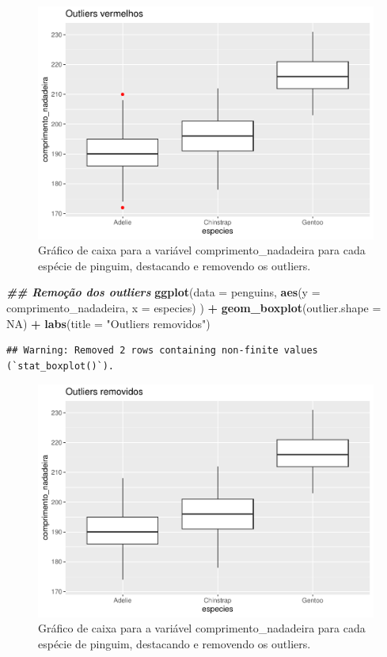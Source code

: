 \documentclass[
]{article}
\newenvironment{Shaded}{\begin{snugshade}}{\end{snugshade}}
\newcommand{\AttributeTok}[1]{\textcolor[rgb]{0.13,0.29,0.53}{#1}}
\newcommand{\ConstantTok}[1]{\textcolor[rgb]{0.56,0.35,0.01}{#1}}
\newcommand{\DocumentationTok}[1]{\textcolor[rgb]{0.56,0.35,0.01}{\textbf{\textit{#1}}}}
\newcommand{\FunctionTok}[1]{\textcolor[rgb]{0.13,0.29,0.53}{\textbf{#1}}}
\newcommand{\NormalTok}[1]{#1}
\newcommand{\SpecialCharTok}[1]{\textcolor[rgb]{0.81,0.36,0.00}{\textbf{#1}}}
\newcommand{\StringTok}[1]{\textcolor[rgb]{0.31,0.60,0.02}{#1}}
\begin{document}
\begin{figure}
\includegraphics[width=0.75\linewidth,height=0.75\textheight]{epr_files/figure-latex/fig-boxplot-outlier-1} \caption{Gráfico de caixa para a variável comprimento_nadadeira para cada espécie de pinguim, destacando e removendo os outliers.}\label{fig:fig-boxplot-outlier-1}
\end{figure}

\begin{Shaded}
\begin{Highlighting}[]
\DocumentationTok{\#\# Remoção dos outliers}
\FunctionTok{ggplot}\NormalTok{(}\AttributeTok{data =}\NormalTok{ penguins, }
       \FunctionTok{aes}\NormalTok{(}\AttributeTok{y =}\NormalTok{ comprimento\_nadadeira, }\AttributeTok{x =}\NormalTok{ especies)}
\NormalTok{       ) }\SpecialCharTok{+}
    \FunctionTok{geom\_boxplot}\NormalTok{(}\AttributeTok{outlier.shape =} \ConstantTok{NA}\NormalTok{) }\SpecialCharTok{+}
    \FunctionTok{labs}\NormalTok{(}\AttributeTok{title =} \StringTok{"Outliers removidos"}\NormalTok{)}
\end{Highlighting}
\end{Shaded}

\begin{verbatim}
## Warning: Removed 2 rows containing non-finite values (`stat_boxplot()`).
\end{verbatim}

\begin{figure}
\includegraphics[width=0.75\linewidth,height=0.75\textheight]{epr_files/figure-latex/fig-boxplot-outlier-2} \caption{Gráfico de caixa para a variável comprimento_nadadeira para cada espécie de pinguim, destacando e removendo os outliers.}\label{fig:fig-boxplot-outlier-2}
\end{figure}
\end{document}
